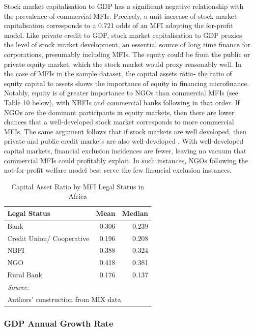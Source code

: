 \documentclass[a4paper, nobind]{templates/ociamthesis}
\begin{document}
Stock market capitalisation to GDP has a significant negative relationship with the prevalence of commercial MFIs. Precisely, a unit increase of stock market capitalisation corresponds to a 0.721 odds of an MFI adopting the for-profit model. Like private credit to GDP, stock market capitalisation to GDP proxies the level of stock market development, an essential source of long time finance for corporations, presumably including MFIs. The equity could be from the public or private equity market, which the stock market would proxy reasonably well. In the case of MFIs in the sample dataset, the capital assets ratio- the ratio of equity capital to assets shows the importance of equity in financing microfinance. Notably, equity is of greater importance to NGOs than commercial MFIs (see Table 10 below), with NBFIs and commercial banks following in that order. If NGOs are the dominant participants in equity markets, then there are lower chances that a well-developed stock market corresponds to more commercial MFIs. The same argument follows that if stock markets are well developed, then private and public credit markets are also well-developed \autocite{schnyder2018twenty}. With well-developed capital markets, financial exclusion incidences are fewer, leaving no vacuum that commercial MFIs could profitably exploit. In such instances, NGOs following the not-for-profit welfare model best serve the few financial exclusion instances.

\begin{table}

\caption{\label{tab:unnamed-chunk-40}Capital Asset Ratio by MFI Legal Status in Africa}
\centering
\begin{tabular}[t]{lrr}
\toprule
Legal Status & Mean & Median\\
\midrule
Bank & 0.306 & 0.239\\
Credit Union/ Cooperative & 0.196 & 0.208\\
NBFI & 0.388 & 0.324\\
NGO & 0.418 & 0.381\\
Rural Bank & 0.176 & 0.137\\
\bottomrule
\multicolumn{3}{l}{\rule{0pt}{1em}\textit{Source: }}\\
\multicolumn{3}{l}{\rule{0pt}{1em}Authors' construction from MIX data}\\
\end{tabular}
\end{table}

\hypertarget{gdp-annual-growth-rate}{%
\subsubsection{GDP Annual Growth Rate}\label{gdp-annual-growth-rate}}
\end{document}

